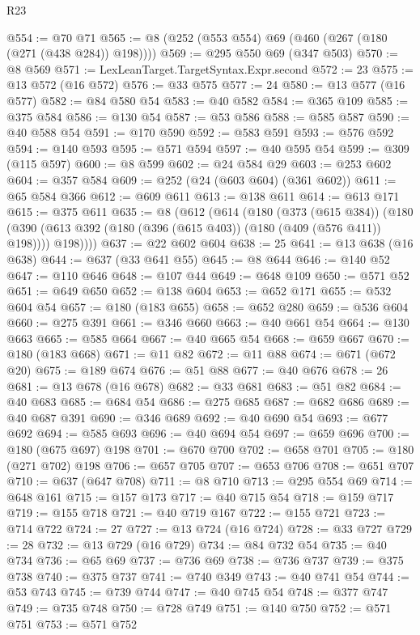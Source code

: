 \begin{lexlean}{R23}
\begin{coremodule}
@554 := @70 @71
@565 := @8 (@252 (@553 @554) @69 (@460 (@267 (@180 (@271 (@438 @284)) @198))))
@569 := @295 @550 @69 (@347 @503)
@570 := @8 @569
@571 := LexLeanTarget.TargetSyntax.Expr.second
@572 := 23
@575 := @13 @572 (@16 @572)
@576 := @33 @575
@577 := 24
@580 := @13 @577 (@16 @577)
@582 := @84 @580 @54
@583 := @40 @582
@584 := @365 @109
@585 := @375 @584
@586 := @130 @54
@587 := @53 @586
@588 := @585 @587
@590 := @40 @588 @54
@591 := @170 @590
@592 := @583 @591
@593 := @576 @592
@594 := @140 @593
@595 := @571 @594
@597 := @40 @595 @54
@599 := @309 (@115 @597)
@600 := @8 @599
@602 := @24 @584 @29
@603 := @253 @602
@604 := @357 @584
@609 := @252 (@24 (@603 @604) (@361 @602))
@611 := @65 @584 @366
@612 := @609 @611
@613 := @138 @611
@614 := @613 @171
@615 := @375 @611
@635 := @8
    (@612
      (@614
        (@180
          (@373 (@615 @384))
          (@180 (@390 (@613 @392 (@180 (@396 (@615 @403)) (@180 (@409 (@576 @411)) @198)))) @198))))
@637 := @22 @602 @604
@638 := 25
@641 := @13 @638 (@16 @638)
@644 := @637 (@33 @641 @55)
@645 := @8 @644
@646 := @140 @52
@647 := @110 @646
@648 := @107 @44
@649 := @648 @109
@650 := @571 @52
@651 := @649 @650
@652 := @138 @604
@653 := @652 @171
@655 := @532 @604 @54
@657 := @180 (@183 @655)
@658 := @652 @280
@659 := @536 @604
@660 := @275 @391
@661 := @346 @660
@663 := @40 @661 @54
@664 := @130 @663
@665 := @585 @664
@667 := @40 @665 @54
@668 := @659 @667
@670 := @180 (@183 @668)
@671 := @11 @82
@672 := @11 @88
@674 := @671 (@672 @20)
@675 := @189 @674
@676 := @51 @88
@677 := @40 @676
@678 := 26
@681 := @13 @678 (@16 @678)
@682 := @33 @681
@683 := @51 @82
@684 := @40 @683
@685 := @684 @54
@686 := @275 @685
@687 := @682 @686
@689 := @40 @687 @391
@690 := @346 @689
@692 := @40 @690 @54
@693 := @677 @692
@694 := @585 @693
@696 := @40 @694 @54
@697 := @659 @696
@700 := @180 (@675 @697) @198
@701 := @670 @700
@702 := @658 @701
@705 := @180 (@271 @702) @198
@706 := @657 @705
@707 := @653 @706
@708 := @651 @707
@710 := @637 (@647 @708)
@711 := @8 @710
@713 := @295 @554 @69
@714 := @648 @161
@715 := @157 @173
@717 := @40 @715 @54
@718 := @159 @717
@719 := @155 @718
@721 := @40 @719 @167
@722 := @155 @721
@723 := @714 @722
@724 := 27
@727 := @13 @724 (@16 @724)
@728 := @33 @727
@729 := 28
@732 := @13 @729 (@16 @729)
@734 := @84 @732 @54
@735 := @40 @734
@736 := @65 @69
@737 := @736 @69
@738 := @736 @737
@739 := @375 @738
@740 := @375 @737
@741 := @740 @349
@743 := @40 @741 @54
@744 := @53 @743
@745 := @739 @744
@747 := @40 @745 @54
@748 := @377 @747
@749 := @735 @748
@750 := @728 @749
@751 := @140 @750
@752 := @571 @751
@753 := @571 @752

\end{coremodule}
\end{lexlean}
